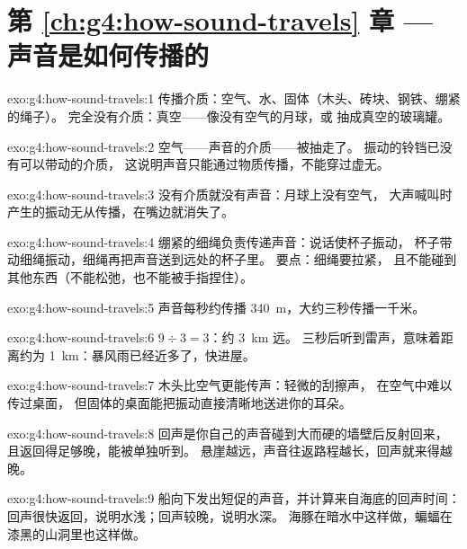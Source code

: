 \section*{第 \ref{ch:g4:how-sound-travels} 章 --- 声音是如何传播的}

\begin{solution}{exo:g4:how-sound-travels:1}
传播介质：空气、水、固体（木头、砖块、钢铁、绷紧的绳子）。
完全没有介质：真空——像没有空气的月球，或
抽成真空的玻璃罐。
\end{solution}

\begin{solution}{exo:g4:how-sound-travels:2}
空气——声音的介质——被抽走了。
振动的铃铛已没有可以带动的介质，
这说明声音只能通过物质传播，不能穿过虚无。
\end{solution}

\begin{solution}{exo:g4:how-sound-travels:3}
没有介质就没有声音：月球上没有空气，
大声喊叫时产生的振动无从传播，在嘴边就消失了。
\end{solution}

\begin{solution}{exo:g4:how-sound-travels:4}
绷紧的细绳负责传递声音：说话使杯子振动，
杯子带动细绳振动，细绳再把声音送到远处的杯子里。
要点：细绳要拉紧，
且不能碰到其他东西（不能松弛，也不能被手指捏住）。
\end{solution}

\begin{solution}{exo:g4:how-sound-travels:5}
声音每秒约传播 \qty{340}{m}，大约三秒传播一千米。
\end{solution}

\begin{solution}{exo:g4:how-sound-travels:6}
$9 \div 3 = 3$：约 \qty{3}{km} 远。
三秒后听到雷声，意味着距离约为 \qty{1}{km}：暴风雨已经近多了，快进屋。
\end{solution}

\begin{solution}{exo:g4:how-sound-travels:7}
木头比空气更能传声：轻微的刮擦声，
在空气中难以传过桌面，
但固体的桌面能把振动直接清晰地送进你的耳朵。
\end{solution}

\begin{solution}{exo:g4:how-sound-travels:8}
回声是你自己的声音碰到大而硬的墙壁后反射回来，
且返回得足够晚，能被单独听到。
悬崖越远，声音往返路程越长，回声就来得越晚。
\end{solution}

\begin{solution}{exo:g4:how-sound-travels:9}
船向下发出短促的声音，并计算来自海底的回声时间：
回声很快返回，说明水浅；回声较晚，说明水深。
海豚在暗水中这样做，蝙蝠在漆黑的山洞里也这样做。
\end{solution}

